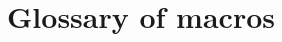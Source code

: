 \documentclass[12pt]{article}
\title{Glossary of macros}
\begin{document}
\newcommand{\gt}{\rightarrow}

\ 

\end{document}
